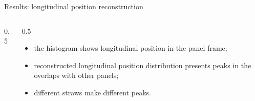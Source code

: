 \documentclass{beamer}[10pt]
\begin{document}
\begin{frame}{Results: longitudinal position reconstruction}
\begin{columns}
\begin{column}{0.5\framewidth}
    \end{column}
    \begin{column}{0.5\framewidth}
      \begin{itemize}
        \item the histogram shows longitudinal position in the panel frame;
        \vspace{3mm}
      \item reconstructed longitudinal position distribution presents peaks in the overlaps with other panels;
        \vspace{3mm}
      \item different straws make different peaks.
      \end{itemize}
    \end{column}
  \end{columns}
\end{frame}
\end{document}
